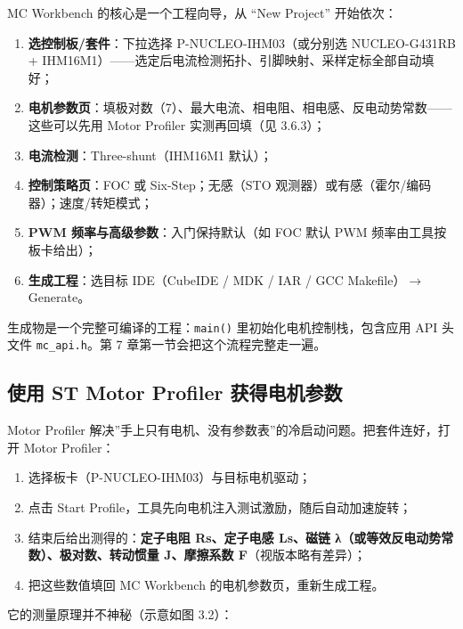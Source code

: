 \documentclass[
  UTF8,
  scheme=plain,
  fontsize=10pt,
  openany
]{ctexbook}
\begin{document}
MC Workbench 的核心是一个工程向导，从 ``New Project'' 开始依次：

\begin{enumerate}
\def\labelenumi{\arabic{enumi}.}
\tightlist
\item
  \textbf{选控制板/套件}：下拉选择 P-NUCLEO-IHM03（或分别选
  NUCLEO-G431RB +
  IHM16M1）------选定后电流检测拓扑、引脚映射、采样定标全部自动填好；
\item
  \textbf{电机参数页}：填极对数（7）、最大电流、相电阻、相电感、反电动势常数------这些可以先用
  Motor Profiler 实测再回填（见 3.6.3）；
\item
  \textbf{电流检测}：Three-shunt（IHM16M1 默认）；
\item
  \textbf{控制策略页}：FOC 或 Six-Step；无感（STO
  观测器）或有感（霍尔/编码器）；速度/转矩模式；
\item
  \textbf{PWM 频率与高级参数}：入门保持默认（如 FOC 默认 PWM
  频率由工具按板卡给出）；
\item
  \textbf{生成工程}：选目标 IDE（CubeIDE / MDK / IAR / GCC
  Makefile）\(\rightarrow\) Generate。
\end{enumerate}

生成物是一个完整可编译的工程：\texttt{main()}
里初始化电机控制栈，包含应用 API 头文件 \texttt{mc\_api.h}。第 7
章第一节会把这个流程完整走一遍。

\subsection{使用 ST Motor Profiler
获得电机参数}\label{ux4f7fux7528-st-motor-profiler-ux83b7ux5f97ux7535ux673aux53c2ux6570}

Motor Profiler
解决''手上只有电机、没有参数表''的冷启动问题。把套件连好，打开 Motor
Profiler：

\begin{enumerate}
\def\labelenumi{\arabic{enumi}.}
\tightlist
\item
  选择板卡（P-NUCLEO-IHM03）与目标电机驱动；
\item
  点击 Start Profile，工具先向电机注入测试激励，随后自动加速旋转；
\item
  结束后给出测得的：\textbf{定子电阻 Rs、定子电感 Ls、磁链
  λ（或等效反电动势常数）、极对数、转动惯量 J、摩擦系数
  F}（视版本略有差异）；
\item
  把这些数值填回 MC Workbench 的电机参数页，重新生成工程。
\end{enumerate}

它的测量原理并不神秘（示意如图 3.2）：
\end{document}
